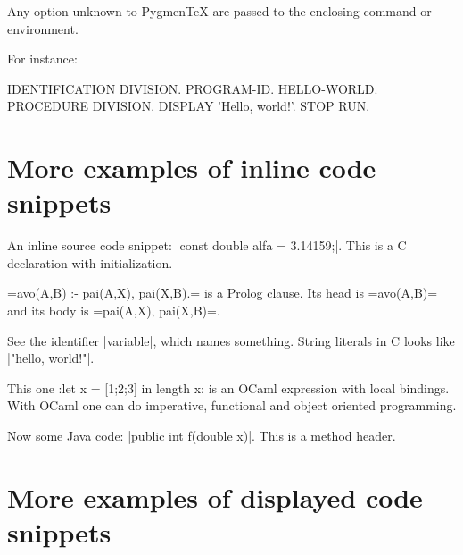 \documentclass[10pt,a4paper]{article}
\begin{document}
Any option unknown to Pygmen\TeX{} are passed to the enclosing command
or environment.

For instance:

\begin{Example}
\begin{pygmented}[lang=cobol,boxing method=tcolorbox,
                  title=\emph{Hello world} in Cobol,
                  coltitle=blue!90!black,colbacktitle=yellow!22]
IDENTIFICATION DIVISION.
       PROGRAM-ID. HELLO-WORLD.
       PROCEDURE DIVISION.
           DISPLAY 'Hello, world!'.
           STOP RUN.
\end{pygmented}
\end{Example}

\section{More examples of inline code snippets}

An inline source code snippet:
\pyginline[lang=c]|const double alfa = 3.14159;|.
This is a C declaration with initialization.

\pyginline[lang=prolog,colback=yellow]=avo(A,B) :- pai(A,X), pai(X,B).=
is a Prolog clause. Its head is
\pyginline[lang=prolog,sty=emacs,colback=yellow,linecolor=red]=avo(A,B)=
and its body is
\pyginline[lang=prolog,sty=vim,colback=black,hidealllines]=pai(A,X), pai(X,B)=.

See the identifier
\pyginline[inline method=efbox,colback=green!25]|variable|, which names
something. String literals in C looks like
\pyginline[lang=c,inline method=tcbox,colback=blue!20,boxrule=2pt]|"hello, world!\n"|.


This one
\pyginline[lang=ocaml,font=\ttfamily\scriptsize,topline=false]:let x = [1;2;3] in length x:
is an OCaml expression with local bindings. With OCaml one can do
imperative, functional and object oriented programming.

Now some Java code:
\pyginline[lang=java,sty=colorful,font=\ttfamily\itshape,linewidth=1pt]|public int f(double x)|.
This is a method header.

\section{More examples of displayed code snippets}

\end{document}
